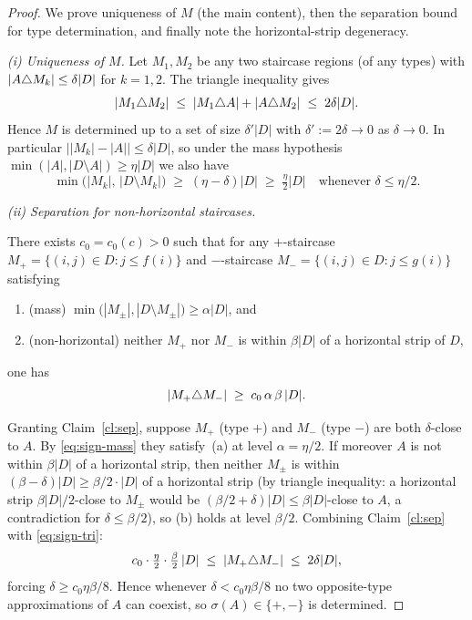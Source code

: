 \begin{proof}
We prove uniqueness of $M$ (the main content), then the separation bound for type
determination, and finally note the horizontal-strip degeneracy.

\medskip\noindent\emph{(i) Uniqueness of $M$.}
Let $M_1, M_2$ be any two staircase regions (of any types) with $|A\triangle M_k|
\le\delta|D|$ for $k=1,2$. The triangle inequality gives
\begin{equation}\label{eq:sign-tri}
  |M_1\triangle M_2| \;\le\; |M_1\triangle A|+|A\triangle M_2| \;\le\; 2\delta|D|.
\end{equation}
Hence $M$ is determined up to a set of size $\delta'|D|$ with $\delta':=2\delta\to 0$
as $\delta\to 0$. In particular $\bigl||M_k|-|A|\bigr|\le\delta|D|$, so under the mass
hypothesis $\min(|A|,|D\setminus A|)\ge\eta|D|$ we also have
\begin{equation}\label{eq:sign-mass}
  \min\bigl(|M_k|,\,|D\setminus M_k|\bigr) \;\ge\; (\eta-\delta)|D| \;\ge\; \tfrac{\eta}{2}|D|
  \quad\text{whenever $\delta\le\eta/2$.}
\end{equation}

\medskip\noindent\emph{(ii) Separation for non-horizontal staircases.}
\begin{claim}\label{cl:sep}
There exists $c_0=c_0(c)>0$ such that for any $+$-staircase $M_+=\{(i,j)\in D:j\le f(i)\}$
and $-$-staircase $M_-=\{(i,j)\in D:j\le g(i)\}$ satisfying
\begin{enumerate}[label=\textup{(\alph*)}, nosep]
  \item \textup{(mass)} $\min\bigl(|M_\pm|,|D\setminus M_\pm|\bigr)\ge\alpha|D|$, and
  \item \textup{(non-horizontal)} neither $M_+$ nor $M_-$ is within $\beta|D|$ of a
        horizontal strip of $D$,
\end{enumerate}
one has
\[
  |M_+\triangle M_-|\;\ge\;c_0\,\alpha\,\beta\,|D|.
\]
\end{claim}

Granting Claim~\ref{cl:sep}, suppose $M_+$ (type $+$) and $M_-$ (type $-$) are both
$\delta$-close to $A$. By \eqref{eq:sign-mass} they satisfy~(a) at level
$\alpha=\eta/2$. If moreover $A$ is not within $\beta|D|$ of a horizontal strip, then
neither $M_\pm$ is within $(\beta-\delta)|D|\ge\beta/2\cdot|D|$ of a horizontal strip
(by triangle inequality: a horizontal strip $\beta|D|/2$-close to $M_\pm$ would be
$(\beta/2+\delta)|D|\le\beta|D|$-close to $A$, a contradiction for $\delta\le\beta/2$),
so (b) holds at level $\beta/2$. Combining Claim~\ref{cl:sep} with \eqref{eq:sign-tri}:
\[
  c_0\cdot\tfrac{\eta}{2}\cdot\tfrac{\beta}{2}\,|D|
  \;\le\;|M_+\triangle M_-|\;\le\;2\delta|D|,
\]
forcing $\delta\ge c_0\eta\beta/8$. Hence whenever $\delta<c_0\eta\beta/8$ no two
opposite-type approximations of $A$ can coexist, so $\sigma(A)\in\{+,-\}$ is determined.


\end{proof}
